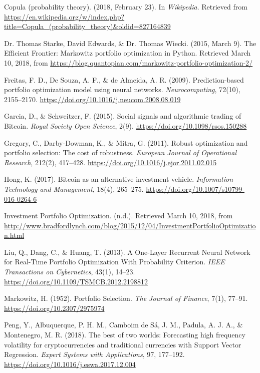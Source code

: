 \documentclass[11pt]{article} %
\begin{document}
\begin{thebibliography}{1}

 Copula (probability theory). (2018, February 23). In \emph{Wikipedia}. Retrieved from
\url{ https://en.wikipedia.org/w/index.php?title=Copula_(probability_theory)&oldid=827164839}

 Dr. Thomas Starke, David Edwards, \& Dr. Thomas Wiecki. (2015, March 9). The Efficient Frontier: Markowitz portfolio optimization in Python. Retrieved March 10, 2018, from \url{https://blog.quantopian.com/markowitz-portfolio-optimization-2/}

 Freitas, F. D., De Souza, A. F., \& de Almeida, A. R. (2009). Prediction-based portfolio optimization model using neural networks. \emph{Neurocomputing}, 72(10), 2155–2170. \url{https://doi.org/10.1016/j.neucom.2008.08.019}

 Garcia, D., \& Schweitzer, F. (2015). Social signals and algorithmic trading of Bitcoin. \emph{Royal Society Open Science}, 2(9). \url{https://doi.org/10.1098/rsos.150288}

 Gregory, C., Darby-Dowman, K., \& Mitra, G. (2011). Robust optimization and portfolio selection: The cost of robustness. \emph{European Journal of Operational Research}, 212(2), 417–428. \url{https://doi.org/10.1016/j.ejor.2011.02.015}

 Hong, K. (2017). Bitcoin as an alternative investment vehicle. \emph{Information Technology and Management}, 18(4), 265–275. \url{https://doi.org/10.1007/s10799-016-0264-6}

 Investment Portfolio Optimization. (n.d.). Retrieved March 10, 2018, from \url{http://www.bradfordlynch.com/blog/2015/12/04/InvestmentPortfolioOptimization.html}

 Liu, Q., Dang, C., \& Huang, T. (2013). A One-Layer Recurrent Neural Network for Real-Time Portfolio Optimization With Probability Criterion. \emph{IEEE Transactions on Cybernetics}, 43(1), 14–23. \url{https://doi.org/10.1109/TSMCB.2012.2198812}

 Markowitz, H. (1952). Portfolio Selection. \emph{The Journal of Finance}, 7(1), 77–91. \url{https://doi.org/10.2307/2975974}

 Peng, Y., Albuquerque, P. H. M., Camboim de Sá, J. M., Padula, A. J. A., \& Montenegro, M. R. (2018). The best of two worlds: Forecasting high frequency volatility for cryptocurrencies and traditional currencies with Support Vector Regression. \emph{Expert Systems with Applications}, 97, 177–192. \url{https://doi.org/10.1016/j.eswa.2017.12.004}


\end{thebibliography}
\end{document}
